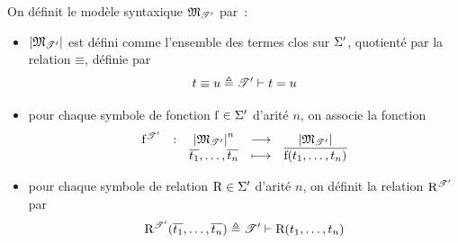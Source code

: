 \begin{definition}
  On définit le modèle syntaxique $\mathfrak{M}_{\mathscr T'}$ par~:
  \begin{itemize}
  \item $\left\vert \mathfrak{M}_{\mathscr T'}\right\vert$ est défini comme l'ensemble des termes clos sur
    $\Sigma'$,
    quotienté par la relation $\mathord{\equiv}$, définie par
    \[t\equiv u \triangleq \mathscr T'\vdash t = u\]
  \item pour chaque symbole de fonction $\mathrm{f}\in\Sigma'$ d'arité $n$, on
    associe la fonction
    \[ \makeFun
       {\toMP{\symbF}{\varT'}}{\carM{\varMM_{\varT'}}^n}{\carM{\varMM_{\varT'}}}
       {\clas{t_1},\ldots,\clas{t_n}}{\clas{\symbF(t_1,\ldots,t_n)}}
    \]
  \item pour chaque symbole de relation $\mathrm{R}\in\Sigma'$ d'arité $n$,
    on définit la relation $\mathrm{R}^{\mathscr T'}$ par
    \[\mathrm{R}^{\mathscr T'}(\overline{t_1},\ldots,\overline{t_n})
    \triangleq \mathscr T'\vdash \mathrm{R}(t_1,\ldots,t_n)\]
  \end{itemize}
\end{definition}

